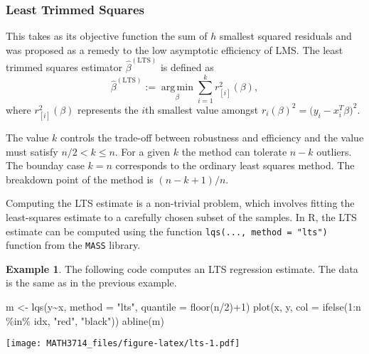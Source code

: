 \documentclass[
  a4paper,
]{article}
\newenvironment{Shaded}{\begin{snugshade}}{\end{snugshade}}
\newcommand{\AttributeTok}[1]{\textcolor[rgb]{0.77,0.63,0.00}{#1}}
\newcommand{\DecValTok}[1]{\textcolor[rgb]{0.00,0.00,0.81}{#1}}
\newcommand{\FunctionTok}[1]{\textcolor[rgb]{0.00,0.00,0.00}{#1}}
\newcommand{\NormalTok}[1]{#1}
\newcommand{\OtherTok}[1]{\textcolor[rgb]{0.56,0.35,0.01}{#1}}
\newcommand{\SpecialCharTok}[1]{\textcolor[rgb]{0.00,0.00,0.00}{#1}}
\newcommand{\StringTok}[1]{\textcolor[rgb]{0.31,0.60,0.02}{#1}}
\theoremstyle{definition}
\theoremstyle{definition}
\newtheorem{example}{Example}[section]
\theoremstyle{definition}
\theoremstyle{definition}
\theoremstyle{remark}
\begin{document}
\hypertarget{least-trimmed-squares}{%
\subsubsection{Least Trimmed Squares}\label{least-trimmed-squares}}

This takes as its objective function the sum of \(h\) smallest squared residuals
and was proposed as a remedy to the low asymptotic efficiency of LMS. The least
trimmed squares estimator \(\hat\beta^\mathrm{(LTS)}\) is defined as
\begin{equation*}
  \hat\beta^\mathrm{(LTS)}
  := \mathop{\mathrm{arg\,min}}\limits_\beta \sum_{i=1}^k r_{[i]}^2(\beta),
\end{equation*}
where \(r_{[i]}^2(\beta)\) represents the \(i\)th smallest value amongst
\(r_i(\beta)^2 = \bigl( y_i- x_i^T\beta \bigr)^2\).

The value \(k\) controls the trade-off between robustness and efficiency and the
value must satisfy \(n/2 < k \leq n\). For a given \(k\) the method can tolerate
\(n-k\) outliers. The bounday case \(k=n\) corresponds to the ordinary least
squares method. The breakdown point of the method is \((n - k +1)/n\).

Computing the LTS estimate is a non-trivial problem, which involves fitting the
least-squares estimate to a carefully chosen subset of the samples. In R, the
LTS estimate can be computed using the function \texttt{lqs(...,\ method\ =\ "lts")}
function from the \texttt{MASS} library.

\begin{example}
The following code computes an LTS regression estimate. The
data is the same as in the previous example.

\begin{Shaded}
\begin{Highlighting}[]
\NormalTok{m }\OtherTok{\textless{}{-}} \FunctionTok{lqs}\NormalTok{(y}\SpecialCharTok{\textasciitilde{}}\NormalTok{x, }\AttributeTok{method =} \StringTok{"lts"}\NormalTok{, }\AttributeTok{quantile =} \FunctionTok{floor}\NormalTok{(n}\SpecialCharTok{/}\DecValTok{2}\NormalTok{)}\SpecialCharTok{+}\DecValTok{1}\NormalTok{)}
\FunctionTok{plot}\NormalTok{(x, y, }\AttributeTok{col =} \FunctionTok{ifelse}\NormalTok{(}\DecValTok{1}\SpecialCharTok{:}\NormalTok{n }\SpecialCharTok{\%in\%}\NormalTok{ idx, }\StringTok{"red"}\NormalTok{, }\StringTok{"black"}\NormalTok{))}
\FunctionTok{abline}\NormalTok{(m)}
\end{Highlighting}
\end{Shaded}

\texttt{[image: MATH3714\_files/figure-latex/lts-1.pdf]}
\end{example}
\end{document}
